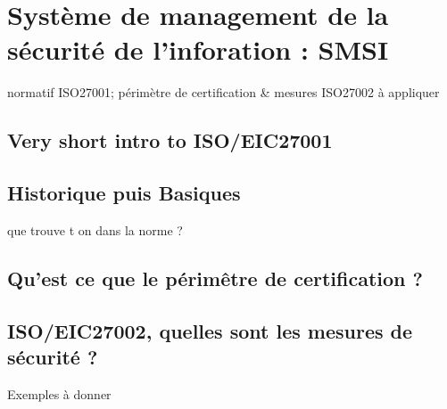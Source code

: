 
\section{Système de management de la sécurité de l'inforation : SMSI}
normatif ISO27001; périmètre de certification \& mesures ISO27002 à appliquer

\subsection{Very short intro to ISO/EIC27001}
\subsection{Historique puis Basiques}
que trouve t on dans la norme ?
\subsection{Qu’est ce que le périmêtre de certification ?}
\subsection{ISO/EIC27002, quelles sont les mesures de sécurité ?}
Exemples à donner

